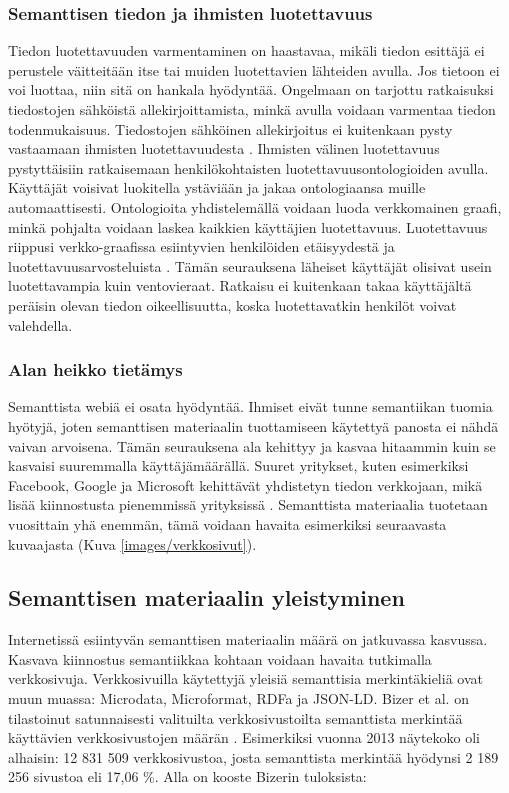 \documentclass[finnish, 12pt, a4paper, elec, utf8, pdfa, online]{aaltothesis}
\begin{document}
{\subsubsection{Semanttisen tiedon ja ihmisten luotettavuus}
Tiedon luotettavuuden varmentaminen on haastavaa, mikäli tiedon esittäjä ei perustele väitteitään itse tai muiden luotettavien lähteiden avulla. Jos tietoon ei voi luottaa, niin sitä on hankala hyödyntää. Ongelmaan on tarjottu ratkaisuksi tiedostojen sähköistä allekirjoittamista, minkä avulla voidaan varmentaa tiedon todenmukaisuus. Tiedostojen sähköinen allekirjoitus ei kuitenkaan pysty vastaamaan ihmisten luotettavuudesta \cite{trust}. Ihmisten välinen luotettavuus pystyttäisiin ratkaisemaan henkilökohtaisten luotettavuusontologioiden avulla. Käyttäjät voisivat luokitella ystäviään ja jakaa ontologiaansa muille automaattisesti. Ontologioita yhdistelemällä voidaan luoda verkkomainen graafi, minkä pohjalta voidaan laskea kaikkien käyttäjien luotettavuus.
Luotettavuus riippusi verkko-graafissa esiintyvien henkilöiden etäisyydestä ja luotettavuusarvosteluista \cite{trust}. Tämän seurauksena läheiset käyttäjät olisivat usein luotettavampia kuin ventovieraat. Ratkaisu ei kuitenkaan takaa käyttäjältä peräisin olevan tiedon oikeellisuutta, koska luotettavatkin henkilöt voivat valehdella.

\subsubsection{Alan heikko tietämys}
Semanttista webiä ei osata hyödyntää. Ihmiset eivät tunne semantiikan tuomia hyötyjä, joten semanttisen materiaalin tuottamiseen käytettyä panosta ei nähdä vaivan arvoisena. Tämän seurauksena ala kehittyy ja kasvaa hitaammin kuin se kasvaisi suuremmalla käyttäjämäärällä. Suuret yritykset, kuten esimerkiksi Facebook, Google ja Microsoft kehittävät yhdistetyn tiedon verkkojaan, mikä lisää kiinnostusta pienemmissä yrityksissä \cite{Facebook} \cite{knowledge_graph} \cite{cortana}. Semanttista materiaalia tuotetaan vuosittain yhä enemmän, tämä voidaan havaita esimerkiksi seuraavasta kuvaajasta (Kuva \ref{images/verkkosivut}).


\subsection{Semanttisen materiaalin yleistyminen}
Internetissä esiintyvän semanttisen materiaalin määrä on jatkuvassa kasvussa. Kasvava kiinnostus semantiikkaa kohtaan voidaan havaita tutkimalla verkkosivuja. Verkkosivuilla käytettyjä yleisiä semanttisia merkintäkieliä ovat muun muassa: Microdata, Microformat, RDFa ja JSON-LD. Bizer et al. on tilastoinut satunnaisesti valituilta verkkosivustoilta semanttista merkintää käyttävien verkkosivustojen määrän \cite{rdfa_usage}. Esimerkiksi vuonna 2013 näytekoko oli alhaisin: 12 831 509 verkkosivustoa, josta semanttista merkintää hyödynsi 2 189 256 sivustoa eli 17,06 \%. Alla on kooste Bizerin tuloksista:

}
\end{document}
